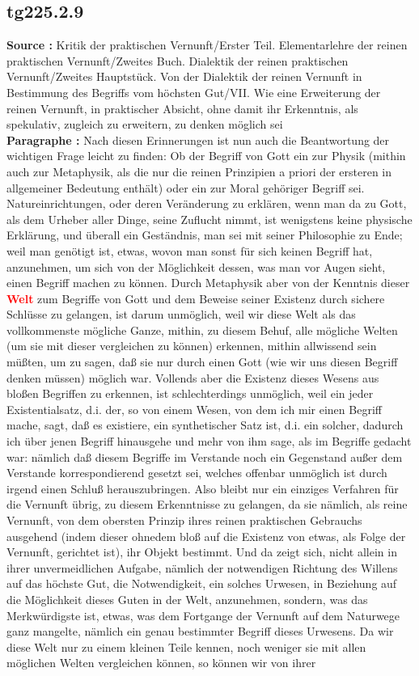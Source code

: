 \documentclass[a4paper,12pt,twoside]{book}
\newcommand{\match}[1]{\textcolor{red}{\textbf{#1}}}
\begin{document}
	\subsection*{tg225.2.9} 
	\textbf{Source : }Kritik der praktischen Vernunft/Erster Teil. Elementarlehre der reinen praktischen Vernunft/Zweites Buch. Dialektik der reinen praktischen Vernunft/Zweites Hauptstück. Von der Dialektik der reinen Vernunft in Bestimmung des Begriffs vom höchsten Gut/VII. Wie eine Erweiterung der reinen Vernunft, in praktischer Absicht, ohne damit ihr Erkenntnis, als spekulativ, zugleich zu erweitern, zu denken möglich sei\\  
	
	\noindent\textbf{Paragraphe : }Nach diesen Erinnerungen ist nun auch die Beantwortung der wichtigen Frage leicht zu finden: Ob der Begriff von Gott ein zur Physik (mithin auch zur Metaphysik, als die nur die reinen Prinzipien a priori der ersteren in allgemeiner  Bedeutung enthält) oder ein zur Moral gehöriger Begriff sei. Natureinrichtungen, oder deren Veränderung zu erklären, wenn man da zu Gott, als dem Urheber aller Dinge, seine Zuflucht nimmt, ist wenigstens keine physische Erklärung, und überall ein Geständnis, man sei mit seiner Philosophie zu Ende; weil man genötigt ist, etwas, wovon man sonst für sich keinen Begriff hat, anzunehmen, um sich von der Möglichkeit dessen, was man vor Augen sieht, einen Begriff machen zu können. Durch Metaphysik aber von der Kenntnis dieser \match{Welt} zum Begriffe von Gott und dem Beweise seiner Existenz durch sichere Schlüsse zu gelangen, ist darum unmöglich, weil wir diese Welt als das vollkommenste mögliche Ganze, mithin, zu diesem Behuf, alle mögliche Welten (um sie mit dieser vergleichen zu können) erkennen, mithin allwissend sein müßten, um zu sagen, daß sie nur durch einen Gott (wie wir uns diesen Begriff denken müssen) möglich war. Vollends aber die Existenz dieses Wesens aus bloßen Begriffen zu erkennen, ist schlechterdings unmöglich, weil ein jeder Existentialsatz, d.i. der, so von einem Wesen, von dem ich mir einen Begriff mache, sagt, daß es existiere, ein synthetischer Satz ist, d.i. ein solcher, dadurch ich über jenen Begriff hinausgehe und mehr von ihm sage, als im Begriffe gedacht war: nämlich daß diesem Begriffe im Verstande noch ein Gegenstand außer dem Verstande korrespondierend gesetzt sei, welches offenbar unmöglich ist durch irgend einen Schluß herauszubringen. Also bleibt nur ein einziges Verfahren für die Vernunft übrig, zu diesem Erkenntnisse zu gelangen, da sie nämlich, als reine Vernunft, von dem obersten Prinzip ihres reinen praktischen Gebrauchs ausgehend (indem dieser ohnedem bloß auf die Existenz von etwas, als Folge der Vernunft, gerichtet ist), ihr Objekt bestimmt. Und da zeigt sich, nicht allein in ihrer unvermeidlichen Aufgabe, nämlich der notwendigen Richtung des Willens auf das höchste Gut, die Notwendigkeit, ein solches Urwesen, in Beziehung auf die Möglichkeit dieses Guten in der Welt, anzunehmen, sondern, was das Merkwürdigste ist, etwas, was dem Fortgange der Vernunft auf dem Naturwege ganz  mangelte, nämlich ein genau bestimmter Begriff dieses Urwesens. Da wir diese Welt nur zu einem kleinen Teile kennen, noch weniger sie mit allen möglichen Welten vergleichen können, so können wir von ihrer 
\end{document}
